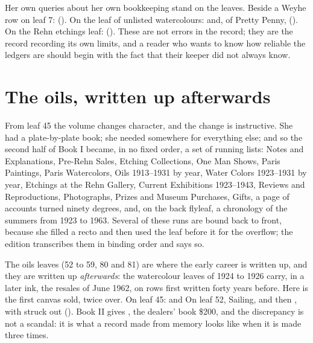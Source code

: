 Her own queries about her own bookkeeping stand on the leaves. Beside a Weyhe row on leaf 7:  (). On the leaf of unlisted watercolours:  and, of Pretty Penny,  (). On the Rehn etchings leaf:  (). These are not errors in the record; they are the record recording its own limits, and a reader who wants to know how reliable the ledgers are should begin with the fact that their keeper did not always know.



\section{The oils, written up afterwards}

From leaf 45 the volume changes character, and the change is instructive. She had a plate-by-plate book; she needed somewhere for everything else; and so the second half of Book I became, in no fixed order, a set of running lists: Notes and Explanations, Pre-Rehn Sales, Etching Collections, One Man Shows, Paris Paintings, Paris Watercolors, Oils 1913--1931 by year, Water Colors 1923--1931 by year, Etchings at the Rehn Gallery, Current Exhibitions 1923--1943, Reviews and Reproductions, Photographs, Prizes and Museum Purchases, Gifts, a page of accounts turned ninety degrees, and, on the back flyleaf, a chronology of the summers from 1923 to 1963. Several of these runs are bound back to front, because she filled a recto and then used the leaf before it for the overflow; the edition transcribes them in binding order and says so.

The oils leaves (52 to 59, 80 and 81) are where the early career is written up, and they are written up \emph{afterwards}: the watercolour leaves of 1924 to 1926 carry, in a later ink, the resales of June 1962, on rows first written forty years before. Here is the first canvas sold, twice over. On leaf 45:  and  On leaf 52, Sailing,  and then , with  struck out (). Book II gives , the dealers' book \$200, and the discrepancy is not a scandal: it is what a record made from memory looks like when it is made three times.

